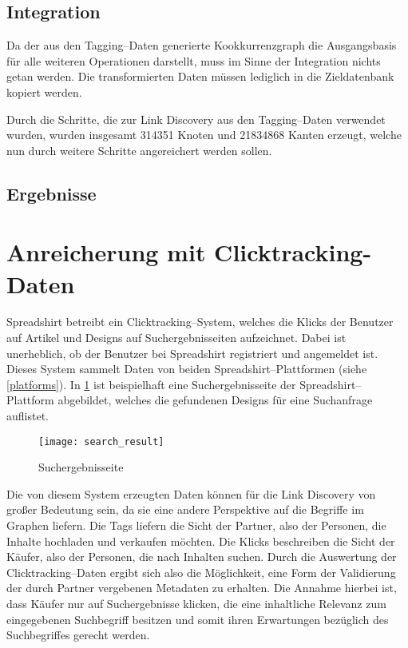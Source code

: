 \subsection{Integration}

Da der aus den Tagging--Daten generierte Kookkurrenzgraph die Ausgangsbasis für alle weiteren Operationen darstellt, muss im Sinne der Integration nichts getan werden. Die transformierten Daten müssen lediglich in die Zieldatenbank kopiert werden.

Durch die Schritte, die zur Link Discovery aus den Tagging--Daten verwendet wurden, wurden insgesamt \num{314351} Knoten und \num{21834868} Kanten erzeugt, welche nun durch weitere Schritte angereichert werden sollen.

\subsection{Ergebnisse}

\section{Anreicherung mit Clicktracking-Daten}
\label{clicktracking}

Spreadshirt betreibt ein Clicktracking--System, welches die Klicks der Benutzer auf Artikel und Designs auf Suchergebnisseiten aufzeichnet. Dabei ist unerheblich, ob der Benutzer bei Spreadshirt registriert und angemeldet ist. Dieses System sammelt Daten von beiden Spreadshirt--Plattformen (siehe \cref{platforms}). In \cref{fig:search_result} ist beispielhaft eine Suchergebnisseite der Spreadshirt--Plattform abgebildet, welches die gefundenen Designs für eine Suchanfrage auflistet.

\begin{figure}
\centering
\texttt{[image: search\_result]}
\caption{Suchergebnisseite}
\label{fig:search_result}
\end{figure}

Die von diesem System erzeugten Daten können für die Link Discovery von großer Bedeutung sein, da sie eine andere Perspektive auf die Begriffe im Graphen liefern. Die Tags liefern die Sicht der Partner, also der Personen, die Inhalte hochladen und verkaufen möchten. Die Klicks beschreiben die Sicht der Käufer, also der Personen, die nach Inhalten suchen. Durch die Auswertung der Clicktracking--Daten ergibt sich also die Möglichkeit, eine Form der Validierung der durch Partner vergebenen Metadaten zu erhalten. Die Annahme hierbei ist, dass Käufer nur auf Suchergebnisse klicken, die eine inhaltliche Relevanz zum eingegebenen Suchbegriff besitzen und somit ihren Erwartungen bezüglich des Suchbegriffes gerecht werden.

